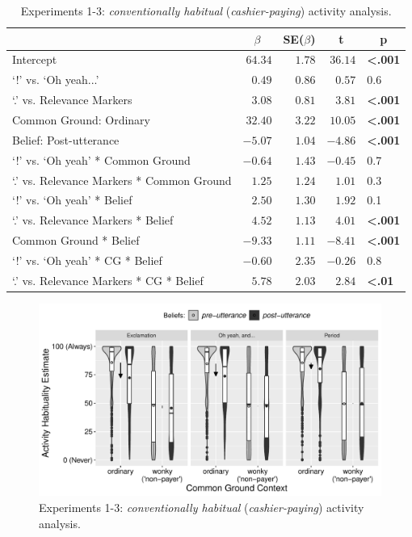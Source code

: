 \documentclass{sp}\usepackage[]{graphicx}\usepackage[]{color}
\makeatletter
\def\maxwidth{ %
  \ifdim\Gin@nat@width>\linewidth
    \linewidth
  \else
    \Gin@nat@width
  \fi
}
\newenvironment{knitrout}{}{} %
\makeatother
\begin{document}
\begin{table}[ht]
\caption{Experiments 1-3: \textit{conventionally habitual} (\textit{cashier-paying}) activity analysis.\label{tab:expall}} 
\begin{center}
\begin{tabular}{lrrrl}
\toprule
\multicolumn{1}{l}{}&\multicolumn{1}{c}{$\beta$}&\multicolumn{1}{c}{SE($\beta$)}&\multicolumn{1}{c}{\textbf{t}}&\multicolumn{1}{c}{\textbf{p}}\tabularnewline
\midrule
Intercept&$64.34$&$1.78$&$36.14$&\textbf{\textless .001}\tabularnewline
`!' vs. `Oh yeah...'&$ 0.49$&$0.86$&$ 0.57$&0.6\tabularnewline
`.' vs. Relevance Markers&$ 3.08$&$0.81$&$ 3.81$&\textbf{\textless .001}\tabularnewline
Common Ground: Ordinary&$32.40$&$3.22$&$10.05$&\textbf{\textless .001}\tabularnewline
Belief: Post-utterance&$-5.07$&$1.04$&$-4.86$&\textbf{\textless .001}\tabularnewline
`!' vs. `Oh yeah' * Common Ground&$-0.64$&$1.43$&$-0.45$&0.7\tabularnewline
`.' vs. Relevance Markers * Common Ground&$ 1.25$&$1.24$&$ 1.01$&0.3\tabularnewline
`!' vs. `Oh yeah' * Belief&$ 2.50$&$1.30$&$ 1.92$&0.1\tabularnewline
`.' vs. Relevance Markers * Belief&$ 4.52$&$1.13$&$ 4.01$&\textbf{\textless .001}\tabularnewline
Common Ground * Belief&$-9.33$&$1.11$&$-8.41$&\textbf{\textless .001}\tabularnewline
`!' vs. `Oh yeah' * CG * Belief&$-0.60$&$2.35$&$-0.26$&0.8\tabularnewline
`.' vs. Relevance Markers * CG * Belief&$ 5.78$&$2.03$&$ 2.84$&\textbf{\textless .01}\tabularnewline
\bottomrule
\end{tabular}\end{center}
\end{table}


\begin{knitrout}
\color{fgcolor}\begin{figure}
\includegraphics[width=\maxwidth]{figure/unnamed-chunk-66-1} \caption{\label{fig:expallhabitual}Experiments 1-3: \textit{conventionally habitual} (\textit{cashier-paying}) activity analysis.}\label{fig:unnamed-chunk-66}
\end{figure}


\end{knitrout}
\end{document}
